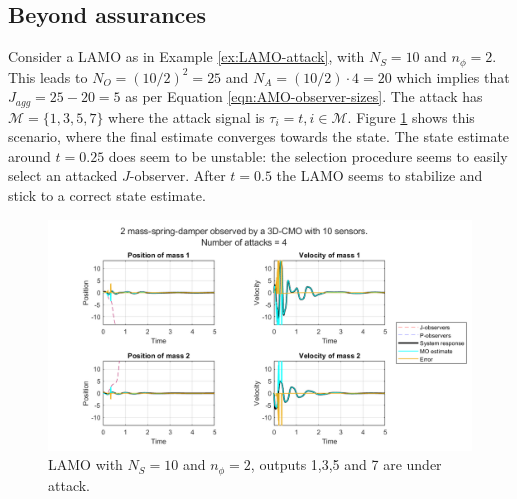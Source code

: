 \subsection{Beyond assurances}
\begin{example}\label{ex:LAMO-unrobust-attack}
    Consider a LAMO as in Example \ref{ex:LAMO-attack}, with $N_S=10$ and $n_{\phi}=2$. This leads to $N_O=(10/2)^2=25$ and $N_A = (10/2)\cdot 4=20$ which implies that $J_{agg}=25-20=5$ as per Equation \eqref{eqn:AMO-observer-sizes}. The attack has $\mathcal{M}=\{1,3,5,7\}$ where the attack signal is $\tau_i=t,i\in\mathcal{M}$. 
    Figure \ref{fig:LAMO-attack} shows this scenario, where the final estimate converges towards the state. The state estimate around $t=0.25$ does seem to be unstable: the selection procedure seems to easily select an attacked $J$-observer. After $t=0.5$ the LAMO seems to stabilize and stick to a correct state estimate.
    \begin{figure}[H]
        \centering
        \includegraphics[width=\linewidth]{report/Figures/LAMO-attack.png}
        \caption{LAMO with $N_S=10$ and $n_{\phi}=2$, outputs 1,3,5 and 7 are under attack.}
        \label{fig:LAMO-attack}
    \end{figure}
\end{example}

